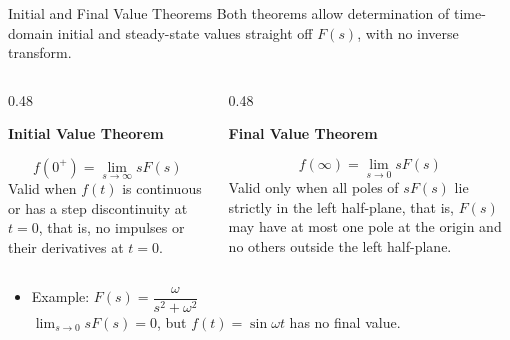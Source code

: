 \documentclass[12pt, aspectratio=169]{beamer}
\begin{document}

\begin{frame}{Initial and Final Value Theorems}
    Both theorems allow determination of time-domain initial and steady-state values straight off $F(s)$, with no inverse transform.
    \vspace{0.2em}
    \begin{columns}[t]
        \begin{column}{0.48\textwidth}
            \centerline{\textbf{Initial Value Theorem}}
            \[
                \boxed{f(0^+) = \lim_{s \to \infty} s F(s)}
            \]
            \small
            Valid when $f(t)$ is continuous or has a step discontinuity at $t = 0$, that is,
            no impulses or their derivatives at $t = 0$.
        \end{column}
        \begin{column}{0.48\textwidth}
            \centerline{\textbf{Final Value Theorem}}
            \[
                \boxed{f(\infty) = \lim_{s \to 0} s F(s)}
            \]
            \small
            Valid only when all poles of $s F(s)$ lie strictly in the left half-plane, that is,
            $F(s)$ may have at most one pole at the origin and no others outside the left
            half-plane.
        \end{column}
    \end{columns}
    \vspace{0.6em}
    \begin{itemize}
        \item Example: $F(s) = \dfrac{\omega}{s^2+\omega^2}$ \\ $\lim_{s\to 0} sF(s) = 0$,
              but $f(t) = \sin\omega t$ \alert{has no final value}.
    \end{itemize}
\end{frame}

\end{document}
